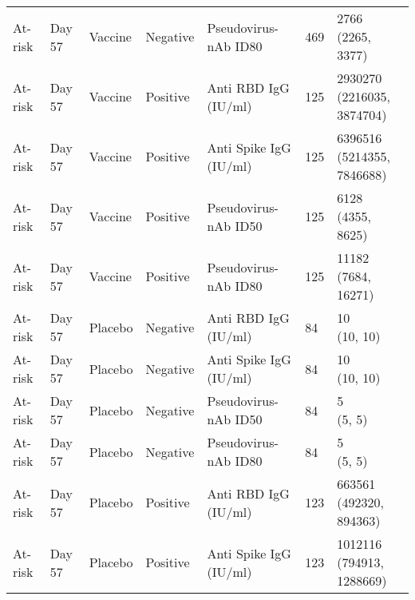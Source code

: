 \documentclass[]{book}
\theoremstyle{definition}
\theoremstyle{definition}
\theoremstyle{definition}
\newcommand{\1}{\mathbbm{1}}
\begin{document}
\begin{landscape}
\begin{ThreePartTable}
\begin{longtable}[t]{>{\raggedright\arraybackslash}p{7cm}llllll}
\hspace{1em}At-risk & Day 57 & Vaccine & Negative & Pseudovirus-nAb ID80 & 469 & \makecell[l]{2766\\(2265, 3377)}\\
\hspace{1em}At-risk & Day 57 & Vaccine & Positive & Anti RBD IgG (IU/ml) & 125 & \makecell[l]{2930270\\(2216035, 3874704)}\\
\hspace{1em}At-risk & Day 57 & Vaccine & Positive & Anti Spike IgG (IU/ml) & 125 & \makecell[l]{6396516\\(5214355, 7846688)}\\
\hspace{1em}At-risk & Day 57 & Vaccine & Positive & Pseudovirus-nAb ID50 & 125 & \makecell[l]{6128\\(4355, 8625)}\\
\hspace{1em}At-risk & Day 57 & Vaccine & Positive & Pseudovirus-nAb ID80 & 125 & \makecell[l]{11182\\(7684, 16271)}\\
\hspace{1em}At-risk & Day 57 & Placebo & Negative & Anti RBD IgG (IU/ml) & 84 & \makecell[l]{10\\(10, 10)}\\
\hspace{1em}At-risk & Day 57 & Placebo & Negative & Anti Spike IgG (IU/ml) & 84 & \makecell[l]{10\\(10, 10)}\\
\hspace{1em}At-risk & Day 57 & Placebo & Negative & Pseudovirus-nAb ID50 & 84 & \makecell[l]{5\\(5, 5)}\\
\hspace{1em}At-risk & Day 57 & Placebo & Negative & Pseudovirus-nAb ID80 & 84 & \makecell[l]{5\\(5, 5)}\\
\hspace{1em}At-risk & Day 57 & Placebo & Positive & Anti RBD IgG (IU/ml) & 123 & \makecell[l]{663561\\(492320, 894363)}\\
\hspace{1em}At-risk & Day 57 & Placebo & Positive & Anti Spike IgG (IU/ml) & 123 & \makecell[l]{1012116\\(794913, 1288669)}\\

\end{longtable}
\end{ThreePartTable}
\end{landscape}
\end{document}
